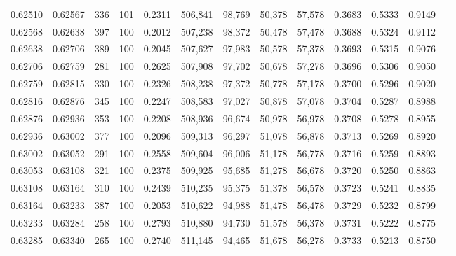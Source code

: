 \begin{tabular}{rrrrrrrrrrrrr}
0.62510 & 0.62567 &   336 & 101 &                                     0.2311 & 506,841 &  98,769 &  50,378 &  57,578 & 0.3683 & 0.5333 & 0.9149 \\
0.62568 & 0.62638 &   397 & 100 &                                     0.2012 & 507,238 &  98,372 &  50,478 &  57,478 & 0.3688 & 0.5324 & 0.9112 \\
0.62638 & 0.62706 &   389 & 100 &                                     0.2045 & 507,627 &  97,983 &  50,578 &  57,378 & 0.3693 & 0.5315 & 0.9076 \\
0.62706 & 0.62759 &   281 & 100 &                                     0.2625 & 507,908 &  97,702 &  50,678 &  57,278 & 0.3696 & 0.5306 & 0.9050 \\
0.62759 & 0.62815 &   330 & 100 &                                     0.2326 & 508,238 &  97,372 &  50,778 &  57,178 & 0.3700 & 0.5296 & 0.9020 \\
0.62816 & 0.62876 &   345 & 100 &                                     0.2247 & 508,583 &  97,027 &  50,878 &  57,078 & 0.3704 & 0.5287 & 0.8988 \\
0.62876 & 0.62936 &   353 & 100 &                                     0.2208 & 508,936 &  96,674 &  50,978 &  56,978 & 0.3708 & 0.5278 & 0.8955 \\
0.62936 & 0.63002 &   377 & 100 &                                     0.2096 & 509,313 &  96,297 &  51,078 &  56,878 & 0.3713 & 0.5269 & 0.8920 \\
0.63002 & 0.63052 &   291 & 100 &                                     0.2558 & 509,604 &  96,006 &  51,178 &  56,778 & 0.3716 & 0.5259 & 0.8893 \\
0.63053 & 0.63108 &   321 & 100 &                                     0.2375 & 509,925 &  95,685 &  51,278 &  56,678 & 0.3720 & 0.5250 & 0.8863 \\
0.63108 & 0.63164 &   310 & 100 &                                     0.2439 & 510,235 &  95,375 &  51,378 &  56,578 & 0.3723 & 0.5241 & 0.8835 \\
0.63164 & 0.63233 &   387 & 100 &                                     0.2053 & 510,622 &  94,988 &  51,478 &  56,478 & 0.3729 & 0.5232 & 0.8799 \\
0.63233 & 0.63284 &   258 & 100 &                                     0.2793 & 510,880 &  94,730 &  51,578 &  56,378 & 0.3731 & 0.5222 & 0.8775 \\
0.63285 & 0.63340 &   265 & 100 &                                     0.2740 & 511,145 &  94,465 &  51,678 &  56,278 & 0.3733 & 0.5213 & 0.8750 \\

\end{tabular}
